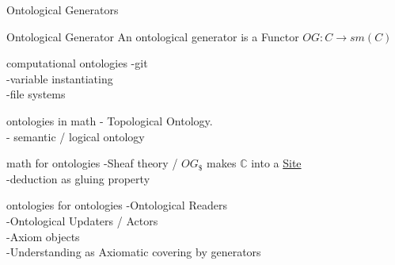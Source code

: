 \documentclass[11pt]{beamer}
\begin{document}
\begin{frame}{Ontological Generators}
\begin{block}{Ontological Generator}
An ontological generator is a Functor $OG: C \to sm(C) $
\end{block}
\end{frame}

\begin{frame}{computational ontologies}
-git\\
-variable instantiating\\
-file systems\\
\end{frame}

\begin{frame}{ontologies in math}
- Topological Ontology.\\
- semantic / logical ontology
\end{frame}

\begin{frame}{math for ontologies}
-Sheaf theory / $OG_\$$ makes $\mathbb C$ into a \underline{Site}\\
-deduction as gluing property
\end{frame}

\begin{frame}{ontologies for ontologies}
-Ontological Readers\\
-Ontological Updaters / Actors\\
-Axiom objects\\
-Understanding as Axiomatic covering by generators\\
\end{frame}
\end{document}

